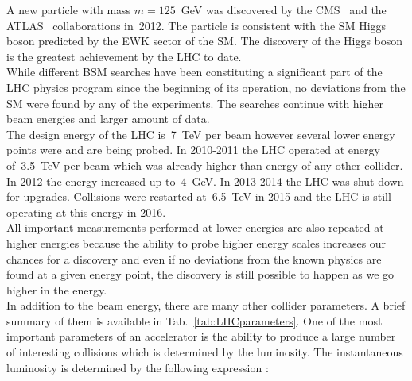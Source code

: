 A new particle with mass $m=125$~GeV was discovered by the CMS~\cite{ref_HiggsPaperCMS} and the ATLAS~\cite{ref_HiggsPaperATLAS} collaborations in~2012. The particle is consistent with the SM Higgs boson predicted by the EWK sector of the SM. The discovery of the Higgs boson is the greatest achievement by the LHC to date. \\


While different BSM searches have been constituting a significant part of the LHC physics program since the beginning of its operation, no deviations from the SM were found by any of the experiments. The searches continue with higher beam energies and larger amount of data.\\



The design energy of the LHC is~7~TeV per beam however several lower energy points were and are being probed. In 2010-2011 the LHC operated at energy of~3.5~TeV per beam which was already higher than energy of any other collider. In 2012 the energy increased up to~4~GeV. In 2013-2014 the LHC was shut down for upgrades. Collisions were restarted at~6.5~TeV in 2015 and the LHC is still operating at this energy in 2016.\\ 

All important measurements performed at lower energies are also repeated at higher energies because the ability to probe higher energy scales increases our chances for a discovery and even if no deviations from the known physics are found at a given energy point, the discovery is still possible to happen as we go higher in the energy. \\ 

In addition to the beam energy, there are many other collider parameters. A brief summary of them is available in Tab.~\ref{tab:LHCparameters}. One of the most important parameters of an accelerator is the ability to produce a large number of interesting collisions which is determined by the luminosity. The instantaneous luminosity is determined by the following expression \cite{ref_PDG}:\\

